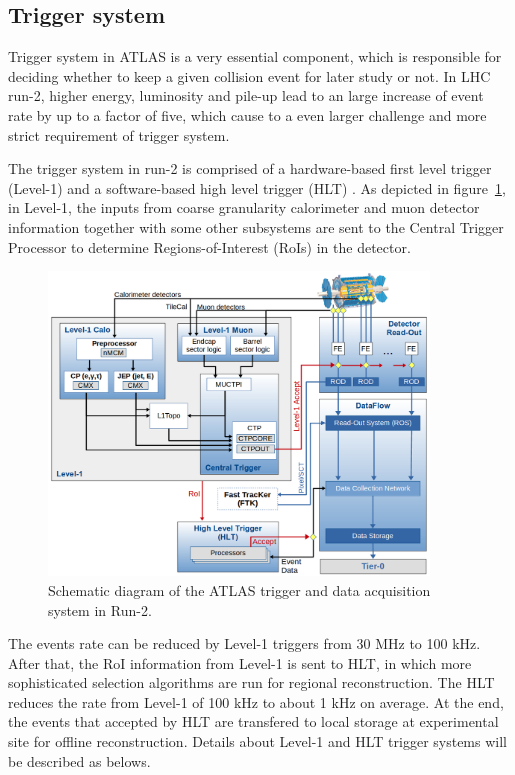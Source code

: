 \subsection{Trigger system}

Trigger system in ATLAS is a very essential component, which is responsible for deciding whether to keep a given collision event for later study or not.
In LHC run-2, higher energy, luminosity and pile-up lead to an large increase of event rate by up to a factor of five, which cause to a even larger challenge and more strict requirement of trigger system.

The trigger system in run-2 is comprised of a hardware-based first level trigger (Level-1) and a software-based high level trigger (HLT) \cite{Ruiz-Martinez:2133909}.
As depicted in figure~\ref{fig:trig_syst}, in Level-1, the inputs from coarse granularity calorimeter and muon detector information together with some other subsystems are sent to the Central Trigger Processor to determine Regions-of-Interest (RoIs) in the detector. 
\begin{figure}[!htb]
  \centering
  \includegraphics[width=0.9\textwidth]{figures/Detector/tdaq-run2-schematic2017.png}
  \caption{Schematic diagram of the ATLAS trigger and data acquisition system in Run-2.}
  \label{fig:trig_syst}
\end{figure}
The events rate can be reduced by Level-1 triggers from 30 MHz to 100 kHz. 
After that, the RoI information from Level-1 is sent to HLT, in which more sophisticated selection algorithms are run for regional reconstruction.
The HLT reduces the rate from Level-1 of 100 kHz to about 1 kHz on average.
At the end, the events that accepted by HLT are transfered to local storage at experimental site for offline reconstruction.
Details about Level-1 and HLT trigger systems will be described as belows.
